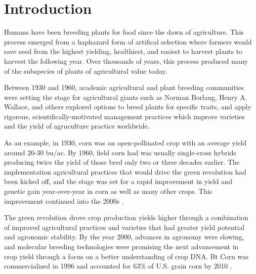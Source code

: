 \section{Introduction}

Humans have been breeding plants for food since the dawn of agriculture. This process
emerged from a haphazard form of artifical selection where farmers would save seed from the 
highest yielding, healthiest, and easiest to harvest plants to harvest the following year. 
Over thousands of years, this process produced many of the subspecies of plants of  
agricultural value today.

Between 1930 and 1960, academic agricultural and plant breeding communities were setting the
stage for agricultural giants such as Norman Borlaug, Henry A. Wallace, and others explored 
options to breed plants for specific traits, and apply rigorous, scientifically-motivated 
management practices which improve varieties and the yield of agruculture practice worldwide.

As an example, in 1930, corn was an open-pollinated crop with an average 
yield around 20-30 bu/ac. By 1960, field corn had was usually single-cross hybrids 
producing twice the yield of those bred only two or three decades earlier. The implementation
agricultural practices that would drive the green revolution had been kicked off, and
the stage was set for a rapid improvement in yield and genetic gain year-over-year in
corn as well as many other crops. This improvement continued into the 2000s \citep{evenson2003}.

The green revolution drove crop production yields higher through a combination of 
improved agricultural practices and varieties that had greater yield potential
and agronomic stability. By the year 2000, advances in agronomy were slowing, and 
molecular breeding technologies were promising the next advancement in crop yield
through a focus on a better understanding of crop DNA. Bt Corn was commercialized
in 1996 and accounted for 63\% of U.S. grain corn by 2010 \citep{fernandez2012}. 


